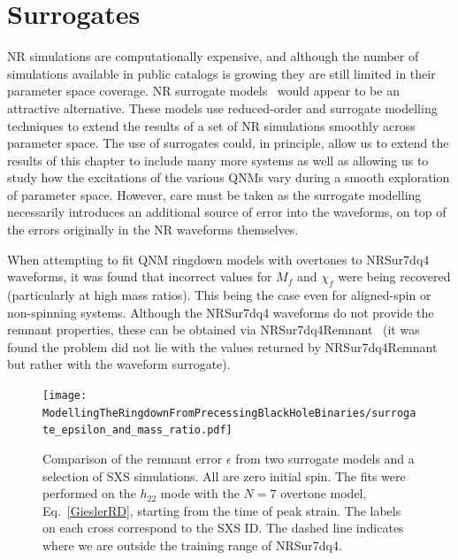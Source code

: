 \section{Surrogates}\label{surrogate-section}

NR simulations are computationally expensive, and although the number of simulations available in public catalogs is growing they are still limited in their parameter space coverage. 
NR surrogate models~\cite{Blackman:2015pia, Blackman:2017pcm, Varma:2019csw, Varma:2018mmi} would appear to be an attractive alternative.
These models use reduced-order and surrogate modelling techniques to extend the results of a set of NR simulations smoothly across parameter space. 
The use of surrogates could, in principle, allow us to extend the results of this chapter to include many more systems as well as allowing us to study how the excitations of the various QNMs vary during a smooth exploration of parameter space.
However, care must be taken as the surrogate modelling necessarily introduces an additional source of error into the waveforms, on top of the errors originally in the NR waveforms themselves.
 
When attempting to fit QNM ringdown models with overtones to NRSur7dq4~\cite{Varma:2019csw} waveforms, it was found that incorrect values for $M_f$ and $\chi_f$ were being recovered (particularly at high mass ratios). This being the case even for aligned-spin or non-spinning systems. Although the NRSur7dq4 waveforms do not provide the remnant properties, these can be obtained via NRSur7dq4Remnant~\cite{Varma:2019csw} (it was found the problem did not lie with the values returned by NRSur7dq4Remnant but rather with the waveform surrogate).

\begin{figure}[t]
    \centering
    \texttt{[image: ModellingTheRingdownFromPrecessingBlackHoleBinaries/surrogate\_epsilon\_and\_mass\_ratio.pdf]}
    \caption[Comparison of remnant-property errors from ringdown fits to two surrogate models and a selection of SXS simulations]{
    Comparison of the remnant error $\epsilon$ from two surrogate models and a selection of SXS simulations. All are zero initial spin. The fits were performed on the $h_{22}$ mode with the $N=7$ overtone model, Eq.~\ref{GieslerRD}, starting from the time of peak strain. The labels on each cross correspond to the SXS ID. The dashed line indicates where we are outside the training range of NRSur7dq4.
    }
    \label{surrogate_epsilon_vs_q}
\end{figure} 


